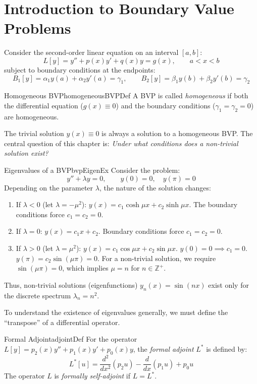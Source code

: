 \documentclass{book}
\begin{document}
\section{Introduction to Boundary Value Problems}

Consider the second-order linear equation on an interval $[a, b]$:
\[
    L[y] = y'' + p(x)y' + q(x)y = g(x), \qquad a < x < b
\]
subject to boundary conditions at the endpoints:
\[
    B_1[y] = \alpha_1 y(a) + \alpha_2 y'(a) = \gamma_1, \qquad B_2[y] = \beta_1 y(b) + \beta_2 y'(b) = \gamma_2
\]

\begin{defn}{Homogeneous BVP}{homogeneousBVPDef}
    A BVP is called \emph{homogeneous} if both the differential equation ($g(x) \equiv 0$) and the boundary conditions ($\gamma_1 = \gamma_2 = 0$) are homogeneous.
\end{defn}

The trivial solution $y(x) \equiv 0$ is always a solution to a homogeneous BVP. The central question of this chapter is: \emph{Under what conditions does a non-trivial solution exist?}

\begin{example}{Eigenvalues of a BVP}{bvpEigenEx}
    Consider the problem:
    \[
        y'' + \lambda y = 0, \qquad y(0) = 0, \quad y(\pi) = 0
    \]
    Depending on the parameter $\lambda$, the nature of the solution changes:
    \begin{enumerate}
        \item If $\lambda < 0$ (let $\lambda = -\mu^2$): $y(x) = c_1 \cosh \mu x + c_2 \sinh \mu x$. The boundary conditions force $c_1 = c_2 = 0$.
        \item If $\lambda = 0$: $y(x) = c_1 x + c_2$. Boundary conditions force $c_1 = c_2 = 0$.
        \item If $\lambda > 0$ (let $\lambda = \mu^2$): $y(x) = c_1 \cos \mu x + c_2 \sin \mu x$.
        $y(0)=0 \implies c_1 = 0$.
        $y(\pi) = c_2 \sin(\mu \pi) = 0$.
        For a non-trivial solution, we require $\sin(\mu \pi) = 0$, which implies $\mu = n$ for $n \in \mathbb{Z}^+$.
    \end{enumerate}
    Thus, non-trivial solutions (eigenfunctions) $y_n(x) = \sin(nx)$ exist only for the discrete spectrum $\lambda_n = n^2$.
\end{example}


To understand the existence of eigenvalues generally, we must define the ``transpose'' of a differential operator.

\begin{defn}{Formal Adjoint}{adjointDef}
    For the operator $L[y] = p_2(x)y'' + p_1(x)y' + p_0(x)y$, the \emph{formal adjoint} $L^*$ is defined by:
    \[
        L^*[u] = \frac{d^2}{dx^2}(p_2 u) - \frac{d}{dx}(p_1 u) + p_0 u
    \]
    The operator $L$ is \emph{formally self-adjoint} if $L = L^*$.
\end{defn}
\end{document}

